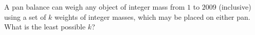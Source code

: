 A pan balance can weigh any object of integer mass from $1$ to $2009$ (inclusive) using a set of $k$ weights of integer masses, which may be placed on either pan. What is the least possible $k$?
